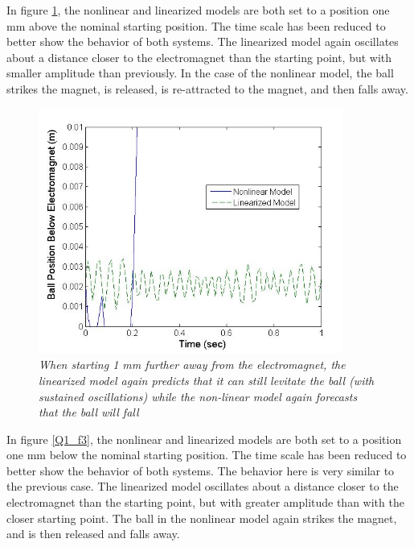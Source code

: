 \documentclass{article}
\theoremstyle{plain}
\theoremstyle{definition}
\theoremstyle{remark}
\begin{document}
In figure \ref{Q1_f2}, the nonlinear and linearized models are both set to a position one mm above the nominal starting position. The time scale has been reduced to better show the behavior of both systems. The linearized model again oscillates about a distance closer to the electromagnet than the starting point, but with smaller amplitude than previously. In the case of the nonlinear model, the ball strikes the magnet, is released, is re-attracted to the magnet, and then falls away.\\

\begin{figure}
\begin{center}
\includegraphics[width = 10cm]{Part1fCloseDisturbance.jpg}
\caption{\emph{When starting 1 mm further away from the electromagnet, the linearized model again predicts that it can still levitate the ball (with sustained oscillations) while the non-linear model again forecasts that the ball will fall}}
\label{Q1_f2}
\end{center}
\end{figure}

In figure \ref{Q1_f3}, the nonlinear and linearized models are both set to a position one mm below the nominal starting position. The time scale has been reduced to better show the behavior of both systems. The behavior here is very similar to the previous case. The linearized model oscillates about a distance closer to the electromagnet than the starting point, but with greater amplitude than with the closer starting point. The ball in the nonlinear model again strikes the magnet, and is then released and falls away.  
\end{document}
